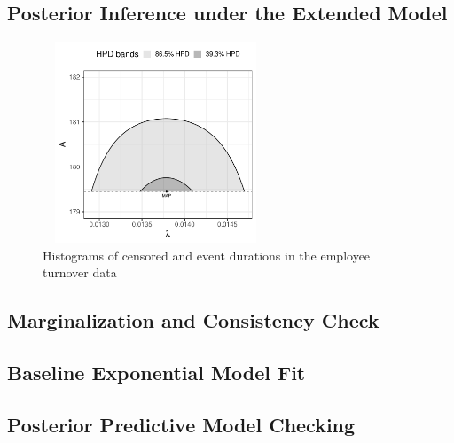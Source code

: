 \subsection{Posterior Inference under the Extended Model}
\begin{figure}[H]
    \centering
    \includegraphics[height=6cm, width=0.6\textwidth]{images/post_contour.pdf}
    \caption{{\small Histograms of censored and event durations in the employee turnover data}}
    \label{fig:contour}
\end{figure}


\subsection{Marginalization and Consistency Check}




\subsection{Baseline Exponential Model Fit}
\label{ecdf的分析}




\subsection{Posterior Predictive Model Checking}